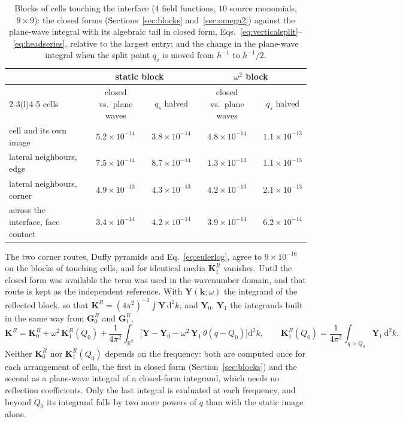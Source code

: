 \documentclass[11pt,a4paper]{article}
\newcommand{\bK}{\mathbf{K}}
\newcommand{\bk}{\mathbf{k}}
\newcommand{\dd}{\mathrm{d}}
\begin{document}
\begin{table}[h]
\centering
\small
\begin{tabular}{lcccc}
\toprule
 & \multicolumn{2}{c}{static block} & \multicolumn{2}{c}{$\omega^2$ block} \\
\cmidrule(lr){2-3}\cmidrule(l){4-5}
cells & closed vs.\ plane waves & $q_s$ halved & closed vs.\ plane waves & $q_s$ halved \\
\midrule
cell and its own image               & $5.2\times10^{-14}$ & $3.8\times10^{-14}$ & $4.8\times10^{-14}$ & $1.1\times10^{-13}$ \\
lateral neighbours, edge             & $7.5\times10^{-14}$ & $8.7\times10^{-14}$ & $1.3\times10^{-13}$ & $1.1\times10^{-13}$ \\
lateral neighbours, corner           & $4.9\times10^{-13}$ & $4.3\times10^{-13}$ & $4.2\times10^{-13}$ & $2.1\times10^{-13}$ \\
across the interface, face contact   & $3.4\times10^{-14}$ & $4.2\times10^{-14}$ & $3.9\times10^{-14}$ & $6.2\times10^{-14}$ \\
\bottomrule
\end{tabular}
\caption{Blocks of cells touching the interface ($4$ field functions, $10$ source monomials, $9\times9$): the
closed forms (Sections~\ref{sec:blocks} and~\ref{sec:omega2}) against the plane-wave integral with its algebraic
tail in closed form, Eqs.~\eqref{eq:verticalsplit}--\eqref{eq:headseries}, relative to the largest entry; and the
change in the plane-wave integral when the split point $q_s$ is moved from $h^{-1}$ to $h^{-1}/2$.}
\label{tab:touching}
\end{table}

The two corner routes, Duffy pyramids and
Eq.~\eqref{eq:eulerlog}, agree to $9\times10^{-16}$ on the blocks of touching cells, and for identical media
$\bK^R_1$ vanishes. Until the closed form was available the term was used in the wavenumber domain, and that
route is kept as the independent reference.
With $\mathbf Y(\bk;\omega)$ the integrand of the reflected block, so
that $\bK^{R}=(4\pi^2)^{-1}\int\mathbf Y\,\dd^2k$, and $\mathbf Y_0$, $\mathbf Y_1$ the integrands built in the
same way from $\mathbf G^{R}_0$ and $\mathbf G^{R}_1$,
\begin{equation}\label{eq:omega2split}
  \bK^{R}=\bK^{R}_0+\omega^2\,\bK^{R}_1(Q_0)
  +\frac{1}{4\pi^2}\int_{\mathbb R^2}\bigl[\mathbf Y-\mathbf Y_0-\omega^2\,\mathbf Y_1\,\theta(q-Q_0)\bigr]\dd^2k,
  \qquad
  \bK^{R}_1(Q_0)=\frac{1}{4\pi^2}\int_{q>Q_0}\mathbf Y_1\,\dd^2k.
\end{equation}
Neither $\bK^{R}_0$ nor $\bK^{R}_1(Q_0)$ depends on the frequency: both are computed once for each
arrangement of cells, the first in closed form (Section~\ref{sec:blocks}) and the second as a plane-wave
integral of a closed-form integrand, which needs no reflection coefficients. Only the last integral is
evaluated at each frequency, and beyond $Q_0$ its integrand falls by two more powers of $q$ than with the
static image alone.
\end{document}
